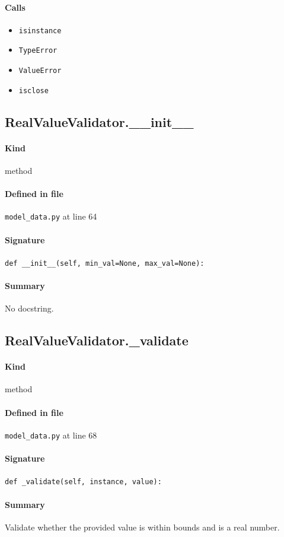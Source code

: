 \documentclass[11pt]{report}
\begin{document}
\paragraph{Calls}
\begin{itemize}[leftmargin=*]
  \item \texttt{isinstance}
  \item \texttt{TypeError}
  \item \texttt{ValueError}
  \item \texttt{isclose}
\end{itemize}
\subsection{RealValueValidator.\_\_init\_\_}
\label{def:model_data.py:RealValueValidator.__init__:L64}
\paragraph{Kind} method
\paragraph{Defined in file} \texttt{model\_data.py} at line 64
\paragraph{Signature} \texttt{def \_\_init\_\_(self, min\_val=None, max\_val=None):}
\paragraph{Summary} No docstring.
\subsection{RealValueValidator.\_validate}
\label{def:model_data.py:RealValueValidator._validate:L68}
\paragraph{Kind} method
\paragraph{Defined in file} \texttt{model\_data.py} at line 68
\paragraph{Signature} \texttt{def \_validate(self, instance, value):}
\paragraph{Summary} Validate whether the provided value is within bounds and is a real number.
\end{document}
